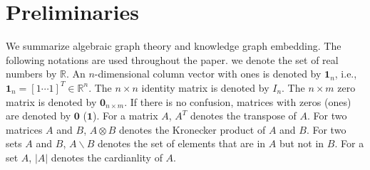 \documentclass{ifacconf}
\begin{document}




\section{Preliminaries} \label{sec_prelim}
We summarize algebraic graph theory and knowledge graph embedding. The following notations are used throughout the paper. we denote the set of real numbers by $\mathbb{R}$. An $n$-dimensional column vector with ones is denoted by $\mathbf{1}_{n}$, i.e., $\mathbf{1}_{n} = [1 \cdots 1]^{T} \in \mathbb{R}^{n}$. The $n \times n$ identity matrix is denoted by $I_n$. { The $n \times m$ zero matrix is denoted by $\mathbf{0}_{n \times m}$. If there is no confusion, matrices with zeros (ones) are denoted by $\mathbf{0}$ ($\mathbf{1}$).} For a matrix $A$, $A^{T}$ denotes the transpose of $A$. 
For two matrices $A$ and $B$, $A \otimes B$ denotes the Kronecker product of $A$ and $B$. For two sets ${A}$ and ${B}$, %
${A} \backslash {B}$ denotes the set of elements that are in ${A}$ but not in ${B}$. For a set $A$, $|A|$ denotes the cardianlity of $A$.
\end{document}
